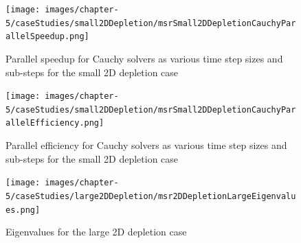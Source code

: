 \begin{figure}[p]
    \centering
    \texttt{[image: images/chapter-5/caseStudies/small2DDepletion/msrSmall2DDepletionCauchyParallelSpeedup.png]}
    \caption{Parallel speedup for Cauchy solvers as various time step sizes and sub-steps for the small 2D depletion case}
    \label{fig:small_2D_depletion_cauchy_speedup}
\end{figure}

\clearpage

\begin{figure}[p]
    \centering
    \texttt{[image: images/chapter-5/caseStudies/small2DDepletion/msrSmall2DDepletionCauchyParallelEfficiency.png]}
    \caption{Parallel efficiency for Cauchy solvers as various time step sizes and sub-steps for the small 2D depletion case}
    \label{fig:small_2D_depletion_cauchy_parallel_eff}
\end{figure}

\clearpage

\begin{figure}[p]
    \centering
    \texttt{[image: images/chapter-5/caseStudies/large2DDepletion/msr2DDepletionLargeEigenvalues.png]}
    \caption{Eigenvalues for the large 2D depletion case}
    \label{fig:large_2D_depletion_eigenvalues}
\end{figure}

\clearpage


